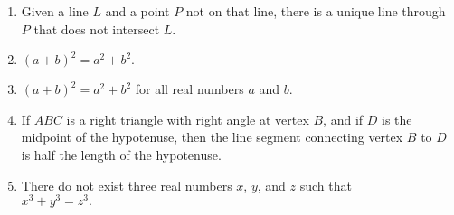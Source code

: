 \begin{previewactivity}[Statements]
\begin{enumerate}
\item Given a line  $L$  and a point  $P$  not on that line, there is a unique line through  $P$  that does not intersect  $L$.

\item $\left( {a + b} \right)^2  = a^2  + b^2.$\label{PA:prop8}

\item $\left( {a + b} \right)^2  = a^2  + b^2$ for all real numbers  $a$  and  $b$.
\label{PA:prop9}

\item If $ABC$ is a right triangle with right angle at vertex $B$, and if $D$ is the midpoint of the hypotenuse, then the line segment connecting vertex $B$ to $D$ is half the length of the hypotenuse.


\item There do not exist three real numbers  $x$, $y$, and  $z$ such that \\
 $x^3  + y^3  = z^3.$

\end{enumerate}
\hbreak
\end{previewactivity}
\endinput

